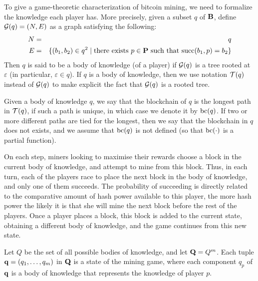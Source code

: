 \documentclass{article}
\begin{document}
To give a game-theoretic characterization of bitcoin mining, we need to formalize the knowledge each player has. More precisely, given a subset $q$ of $\mathbf{B}$, define $\mathcal{G}(q) = (N,E)$ as a graph satisfying the following:
\begin{eqnarray*}
N &=& q\\
E &=& \{ (b_1,b_2) \in q^2 \mid \text{there exists } p \in \mathbf{P} \text{ such that }\text{succ}(b_1,p) = b_2\}
\end{eqnarray*}
Then $q$ is said to be a body of knowledge (of a player) if $\mathcal{G}(q)$ is a tree rooted at $\varepsilon$ (in particular, $\varepsilon \in q$). If $q$ is a body of knowledge, then we use notation $\mathcal{T}(q)$ instead of $\mathcal{G}(q)$ to make explicit the fact that $\mathcal{G}(q)$ is a rooted tree.

Given a body of knowledge $q$, we say that the blockchain of $q$ is the longest path in $\mathcal{T}(q)$, if such a path is unique, in which case we denote it by $\text{bc}(q)$. If two or more different paths are tied for the longest, then we say that the blockchain in $q$ does not exists, and we assume that $\text{bc}(q)$ is not defined (so that $\text{bc}(\cdot)$ is a partial function).

On each step, miners looking to maximise their rewards choose a block in the current body of knowledge, and attempt to mine from this block. Thus, in each turn, each of the players race to place the next block in the body of knowledge, and only one of them succeeds. The probability of succeeding is directly related to the comparative amount of hash power available to this player, the more hash power the likely it is that she will mine the next block before the rest of the players. Once a player places a block, this block is added to the current state, obtaining a different body of knowledge, and the game continues from this new state. 

Let $Q$ be the set of all possible bodies of knowledge, and let $\mathbf{Q} = Q^m$. Each tuple $\mathbf{q} = (q_1, \ldots, q_m)$ in $\mathbf{Q}$ is a state of the mining game, where each component $q_p$ of $\mathbf{q}$ is a body of knowledge that represents the knowledge of player $p$.
\end{document}

